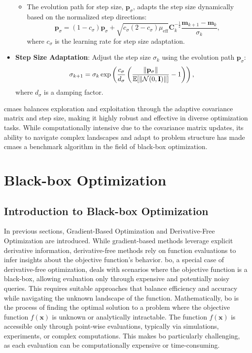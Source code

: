 \begin{itemize}
\begin{itemize}
        \item The evolution path for step size, \(\mathbf{p}_\sigma\), adapts the step size dynamically based on the normalized step directions:
        \begin{equation*}
        \mathbf{p}_\sigma = (1 - c_\sigma) \mathbf{p}_\sigma + \sqrt{c_\sigma (2 - c_\sigma) \mu_\text{eff}} \mathbf{C}_k^{-\frac{1}{2}} \frac{\mathbf{m}_{k+1} - \mathbf{m}_k}{\sigma_k},
        \end{equation*}
        where \(c_\sigma\) is the learning rate for step size adaptation.
    \end{itemize}
    
    \item \textbf{Step Size Adaptation}: Adjust the step size \(\sigma_k\) using the evolution path \(\mathbf{p}_\sigma\):
    \begin{equation*}
    \sigma_{k+1} = \sigma_k \exp\left(\frac{c_\sigma}{d_\sigma} \left(\frac{\norm{\mathbf{p}_\sigma}}{\mathbb{E}[\norm{\mathcal{N}(0, \mathbf{I})}]} - 1\right)\right),
    \end{equation*}
    where \(d_\sigma\) is a damping factor.
\end{itemize}

\ac{cmaes} balances exploration and exploitation through the adaptive covariance matrix and step size, making it highly robust and effective in diverse optimization tasks. While computationally intensive due to the covariance matrix updates, its ability to navigate complex landscapes and adapt to problem structure has made \ac{cmaes} a benchmark algorithm in the field of black-box optimization.


\section{Black-box Optimization}
\label{section:black_box_optimization}
\subsection{Introduction to Black-box Optimization}
In previous sections, Gradient-Based Optimization and Derivative-Free Optimization are introduced.
While gradient-based methods leverage explicit derivative information, derivative-free methods rely on function evaluations to infer insights about the objective function's behavior. \acf{bo}, a special case of derivative-free optimization, deals with scenarios where the objective function is a black-box, allowing evaluation only through expensive and potentially noisy queries. This requires suitable approaches that balance efficiency and accuracy while navigating the unknown landscape of the function.  Mathematically, \ac{bo} is the process of finding the optimal solution to a problem where the objective function  $f(\mathbf{x})$ is unknown or analytically intractable. The function $f(\mathbf{x})$ is accessible only through point-wise evaluations, typically via simulations, experiments, or complex computations. This makes \ac{bo} particularly challenging, as each evaluation can be computationally expensive or time-consuming.  

